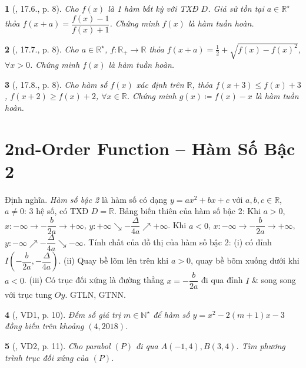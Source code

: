 \documentclass{article}
\newtheorem{baitoan}{}
\begin{document}
\begin{baitoan}[\cite{Hai_Hung_Thu_Tung_ncpt_Toan_10_tap_2}, 17.6., p. 8]
	Cho $f(x)$ là 1 hàm bất kỳ với {\rm TXĐ} $D$. Giả sử tồn tại $a\in\mathbb{R}^\star$ thỏa $f(x + a) = \dfrac{f(x) - 1}{f(x) + 1}$. Chứng minh $f(x)$ là hàm tuần hoàn.
\end{baitoan}

\begin{baitoan}[\cite{Hai_Hung_Thu_Tung_ncpt_Toan_10_tap_2}, 17.7., p. 8]
	Cho $a\in\mathbb{R}^\star$, $f:\mathbb{R}_+\to\mathbb{R}$ thỏa $f(x + a) = \frac{1}{2} + \sqrt{f(x) - f(x)^2}$, $\forall x > 0$. Chứng minh $f(x)$ là hàm tuần hoàn.
\end{baitoan}

\begin{baitoan}[\cite{Hai_Hung_Thu_Tung_ncpt_Toan_10_tap_2}, 17.8., p. 8]
	Cho hàm số $f(x)$ xác định trên $\mathbb{R}$, thỏa $f(x + 3)\le f(x) + 3$, $f(x + 2)\ge f(x) + 2$, $\forall x\in\mathbb{R}$. Chứng minh $g(x)\coloneqq f(x) - x$ là hàm tuần hoàn.
\end{baitoan}


\section{2nd-Order Function -- Hàm Số Bậc 2}
 {\sf Định nghĩa.} {\it Hàm số bậc 2} là hàm số có dạng $y = ax^2 + bx + c$ với $a,b,c\in\mathbb{R}$, $a\ne0$: 3 hệ số, có TXĐ $D = \mathbb{R}$.  Bảng biến thiên của hàm số bậc 2: Khi $a > 0$, $x:-\infty\to-\dfrac{b}{2a}\to+\infty$, $y:+\infty\searrow-\dfrac{\Delta}{4a}\nearrow+\infty$. Khi $a < 0$, $x:-\infty\to-\dfrac{b}{2a}\to+\infty$, $y:-\infty\nearrow-\dfrac{\Delta}{4a}\searrow-\infty$.  Tính chất của đồ thị của hàm số bậc 2: (i) có đỉnh $I\left(-\dfrac{b}{2a},-\dfrac{\Delta}{4a}\right)$. (ii) Quay bề lõm lên trên khi $a > 0$, quay bề bõm xuống dưới khi $a < 0$. (iii) Có trục đối xứng là đường thẳng $x = -\dfrac{b}{2a}$ đi qua đỉnh $I$ \& song song với trục tung $Oy$.  {\sf GTLN, GTNN.} 

\begin{baitoan}[\cite{Hai_Hung_Thu_Tung_ncpt_Toan_10_tap_2}, VD1, p. 10]
	Đếm số giá trị $m\in\mathbb{N}^\star$ để hàm số $y = x^2 - 2(m + 1)x - 3$ đồng biến trên khoảng $(4,2018)$.
\end{baitoan}

\begin{baitoan}[\cite{Hai_Hung_Thu_Tung_ncpt_Toan_10_tap_2}, VD2, p. 11]
	Cho parabol $(P)$ đi qua $A(-1,4),B(3,4)$. Tìm phương trình trục đối xứng của $(P)$.
\end{baitoan}
\end{document}
